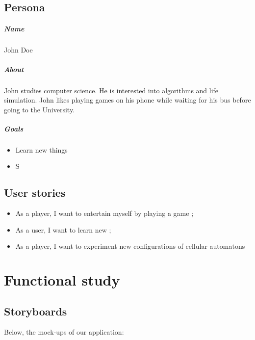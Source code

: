 \documentclass{report}
\begin{document}
\section{Persona}

\paragraph{Name}
John Doe
\paragraph{About}
John studies computer science. He is interested into algorithms and life simulation. John likes playing games on his phone while waiting for his bus before going to the University.
\paragraph{Goals}
\begin{itemize}
\item Learn new things
\item S
\end{itemize}

\section{User stories}
\begin{itemize}
	\item As a player, I want to entertain myself by playing a game ;
	\item As a user, I want to learn new ;
	\item As a player, I want to experiment new configurations of cellular automatons
\end{itemize}

\chapter{Functional study}

\section{Storyboards}

Below, the mock-ups of our application:
\vspace{12pt}
\end{document}
